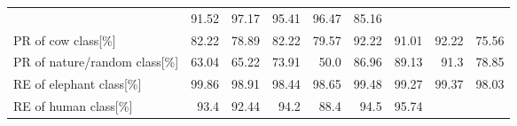 \begin{table}[ht]
{\begin{tabular}{lrrrrrrrr}
                                        & \cellcolor{tbyellow} 91.52 
                                        & \cellcolor{tbgreen}  97.17 
                                        & \cellcolor{tbyellow} 95.41 
                                        & \cellcolor{tbgreeny} 96.47
                                        & \cellcolor{tbred}    85.16 \\
        PR of cow class[\%]             & \cellcolor{tbyellow} 82.22 
                                        & \cellcolor{tbyellow} 78.89 
                                        & \cellcolor{tbyellow} 82.22 
                                        & \cellcolor{tbyellow} 79.57 
                                        & \cellcolor{tbgreen}  92.22 
                                        & \cellcolor{tbgreeny} 91.01 
                                        & \cellcolor{tbgreen}  92.22 
                                        & \cellcolor{tbred}    75.56 \\
        PR of nature/random class[\%]   & \cellcolor{tbyellow} 63.04 
                                        & \cellcolor{tbyellow} 65.22 
                                        & \cellcolor{tbyellow} 73.91 
                                        & \cellcolor{tbred}    50.0  
                                        & \cellcolor{tbgreeny} 86.96 
                                        & \cellcolor{tbgreeny} 89.13 
                                        & \cellcolor{tbgreen}  91.3 
                                        & \cellcolor{tbyellow} 78.85 \\\midrule
        RE of elephant class[\%]        & \cellcolor{tbgreen}  99.86 
                                        & \cellcolor{tbyellow} 98.91 
                                        & \cellcolor{tbyellow} 98.44 
                                        & \cellcolor{tbyellow} 98.65 
                                        & \cellcolor{tbgreeny} 99.48 
                                        & \cellcolor{tbgreeny} 99.27 
                                        & \cellcolor{tbgreeny} 99.37 
                                        & \cellcolor{tbred}    98.03 \\
        RE of human class[\%]           & \cellcolor{tbyellow} 93.4  
                                        & \cellcolor{tbyellow} 92.44 
                                        & \cellcolor{tbgreeny} 94.2  
                                        & \cellcolor{tbred}    88.4  
                                        & \cellcolor{tbgreeny} 94.5  
                                        & \cellcolor{tbgreen}  95.74 

\end{tabular}}
\end{table}
